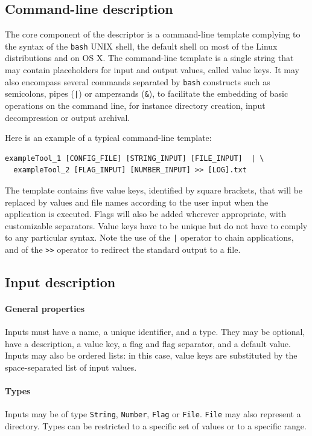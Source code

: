 \documentclass[a4paper,num-refs]{oup-contemporary}
\begin{document}
\subsection{Command-line description}

The core component of the descriptor is a command-line template
complying to the syntax of the \texttt{bash} UNIX shell, the default
shell on most of the Linux distributions and on OS X. The command-line
template is a single string that may contain placeholders for input and output values, called
value keys. It may also encompass several commands separated by
\texttt{bash} constructs such as semicolons, pipes (\texttt{|}) or
ampersands (\texttt{\&}), to facilitate the embedding of basic
operations on the command line, for instance directory creation, input
decompression or output archival.

Here is an example of a typical command-line template:
\begin{verbatim}
exampleTool_1 [CONFIG_FILE] [STRING_INPUT] [FILE_INPUT]  | \
  exampleTool_2 [FLAG_INPUT] [NUMBER_INPUT] >> [LOG].txt
\end{verbatim}
The template contains five value keys, identified by square brackets,
that will be replaced by values and file names according to the user
input when the application is executed. Flags will also be added
wherever appropriate, with customizable separators. Value keys have to
be unique but do not have to comply to any particular syntax. Note the
use of the \texttt{|} operator to chain applications, and of
the \texttt{>>} operator to redirect the standard output to a file.

\subsection{Input description}

\paragraph{General properties} Inputs must have a name, a unique
identifier, and a type. They may be optional, have a description, a
value key, a flag and flag separator, and a default value. Inputs may
also be ordered lists: in this case, value keys are substituted by the
space-separated list of input values.

\paragraph{Types} Inputs may be of type \texttt{String}, \texttt{Number},
\texttt{Flag} or \texttt{File}. \texttt{File} may also represent a directory.
Types can be restricted to a specific set of values or to a specific range.
\end{document}

